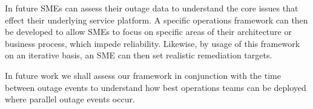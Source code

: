 \documentclass[conference]{IEEEtran}
\begin{document}
In future SMEs can assess their outage data to understand the core issues that effect their underlying service platform. A specific operations framework can then be developed to allow SMEs to focus on specific areas of their architecture or business process, which impede reliability. Likewise, by usage of this framework on an iterative basis, an SME can then set realistic remediation targets. \par

In future work we shall assess our framework in conjunction with the time between outage events to understand how best operations teams can be deployed where parallel outage events occur.  \par

%
%



%
%
\end{document}
